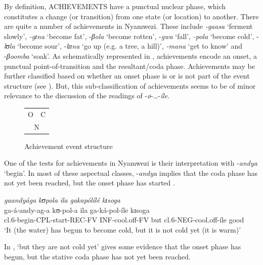 \documentclass[output=paper,newtxmath,modfonts,nonflat,draftmode]{langsci/langscibook}
\begin{document}
By definition, ACHIEVEMENTS have a punctual nuclear phase, which constitutes a change (or transition) from one state (or location) to another. There are quite a number of achievements in Nyamwezi. These include \textit{-gaasa} ‘ferment slowly’, \textit{-gɪ}\textit{na} ‘become fat’, -\textit{βola} ‘become rotten’, -\textit{gwa} ‘fall’, \textit{-pola} ‘become cold’, -\textit{lʊ}\textit{la} ‘become sour’, -\textit{lɪɪ}\textit{na} ‘go up (e.g. a tree, a hill)’, \textit{-mana} ‘get to know’ and -\textit{βoomba} ‘soak’. As schematically represented in , achievements encode an onset, a punctual point-of-transition and the resultant/coda phase. Achievements may be further classified based on whether an onset phase is or is not part of the event structure (see ). But, this sub-classification of achievements seems to be of minor relevance to the discussion of the readings of -\textit{ø}-\ldots-\textit{íle}.

\begin{figure}
\caption{Achievement event structure }
\begin{center}
\begin{tabularx}{.3\textwidth}{c|c}
    \cline{1-2}
     O & C\\
    \cline{1-2}
    \multicolumn{2}{c}{N}\\
\end{tabularx}
\end{center}
\label{fig:kanijo:5}
\end{figure} 

One of the tests for achievements in Nyamwezi is their interpretation with -\textit{andya} ‘begin’. In most of these aspectual classes, -\textit{andya} implies that the coda phase has not yet been reached, but the onset phase has started . 

\ea \label{ex:kanijo:9}
\glll \textit{gaandyága} \textit{kʊ}\textit{pola} \textit{ila} \textit{gakapólílé} \textit{kɪ}\textit{soga}\\
ga-á-andy-ag-a kʊ-pol-a ila ga-ká-pol-íle kɪsoga\\   
cl.6-begin-CPL-start-REC-FV INF-cool.off-FV but cl.6-NEG-cool.off-íle good\\
\glt ‘It (the water) has begun to become cold, but it is not cold yet (it is warm)’\\
\z

In , ‘but they are not cold yet’ gives some evidence that the onset phase has begun, but the stative coda phase has not yet been reached.
\end{document}
